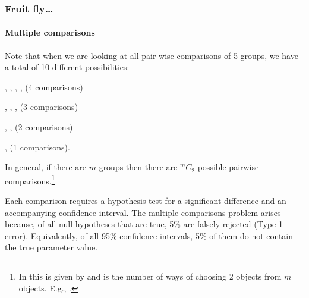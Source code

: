 \documentclass{beamer}\usepackage[]{graphicx}\usepackage[]{xcolor}
\begin{document}
\begin{frame}[fragile]
\frametitle{Fruit fly\ldots}
\framesubtitle{Multiple comparisons}

Note that when we are looking at all pair-wise comparisons of 5 groups,
we have a total of 10 different possibilities: \medskip

, , , , (4 comparisons)

, , , (3 comparisons)

, , (2 comparisons)

, (1 comparisons).

\medskip
In general, if there are $m$ groups then there are $^{m}C_2$ possible pairwise comparisons.\footnote{In  this is given by  and is the number of ways of choosing 2 objects from $m$ objects. E.g., .}

\medskip
Each comparison requires a hypothesis test for a significant difference and an accompanying confidence interval. The multiple comparisons problem arises because, of all null hypotheses that are true, 5\% are falsely rejected (Type 1 error). Equivalently, of all 95\% confidence intervals, 5\% of them do not contain the true parameter value.

\end{frame}
\end{document}
